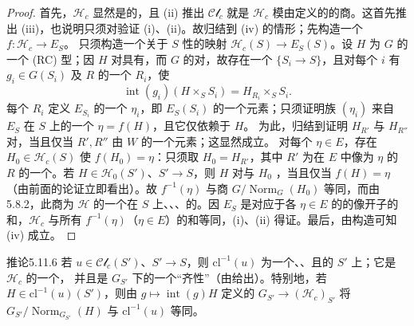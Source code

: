 \begin{proof}
首先，$\mathcal H_c$ 显然是的，且 (ii) 推出 $\mathcal{Cl}_c$ 就是 $\mathcal H_c$ 模由定义的的商。这首先推出 (iii)，也说明只须对验证 (i)、(ii)。故归结到 (iv) 的情形；先构造一个 $f:\mathcal H_c\to E_S$。
只须构造一个关于 $S$ 性的映射 $\mathcal H_c(S)\to E_S(S)$。设 $H$ 为 $G$ 的一个 (RC) 型；因 $H$ 对具有，而 $G$ 的对，故存在一个 $\{S_i\to S\}$，且对每个 $i$ 有 $g_i\in G(S_i)$ 及 $R$ 的一个 $R_i$，使
\[\operatorname{int}(g_i)(H\times_SS_i)=H_{R_i}\times_SS_i.\]
每个 $R_i$ 定义 $E_{S_i}$ 的一个 $\eta_i$，即 $E_S(S_i)$ 的一个元素；只须证明族 $(\eta_i)$ 来自 $E_S$ 在 $S$ 上的一个 $\eta=f(H)$，且它仅依赖于 $H$。
为此，归结到证明 $H_{R'}$ 与 $H_{R''}$ 对，当且仅当 $R',R''$ 由  $W$ 的一个元素；这显然成立。
对每个 $\eta\in E$，存在 $H_0\in\mathcal H_c(S)$ 使 $f(H_0)=\eta$：只须取 $H_0=H_{R'}$，其中 $R'$ 为在 $E$ 中像为 $\eta$ 的 $R$ 的一个。若 $H\in\mathcal H_0(S')$、$S'\to S$，则 $H$ 对与 $H_0$ ，当且仅当 $f(H)=\eta$（由前面的论证立即看出）。故 $f^{-1}(\eta)$ 与商 $G/\operatorname{Norm}_G(H_0)$ 等同，而由 5.8.2，此商为 $\mathcal H$ 的一个在 $S$ 上、、、的。因 $E_S$ 是对应于各 $\eta\in E$ 的的像开子的和，$\mathcal H_c$ 与所有 $f^{-1}(\eta)$（$\eta\in E$）的和等同，(i)、(ii) 得证。最后，由构造可知 (iv) 成立。
\end{proof}
\begin{SGAresult}{推论}{5.11.6}
若 $u\in\mathcal{Cl}_c(S')$、$S'\to S$，则 $\mathrm{cl}^{-1}(u)$ 为一个、、且的 $S'$ 上；它是 $\mathcal H_c$ 的一个，
并且是 $G_{S'}$ 下的一个“齐性”（由给出）。特别地，若 $H\in\mathrm{cl}^{-1}(u)(S')$，则由 $g\mapsto\operatorname{int}(g)H$ 定义的 $G_{S'}\to(\mathcal H_c)_{S'}$ 将 $G_{S'}/\operatorname{Norm}_{G_{S'}}(H)$ 与 $\mathrm{cl}^{-1}(u)$ 等同。
\end{SGAresult}
